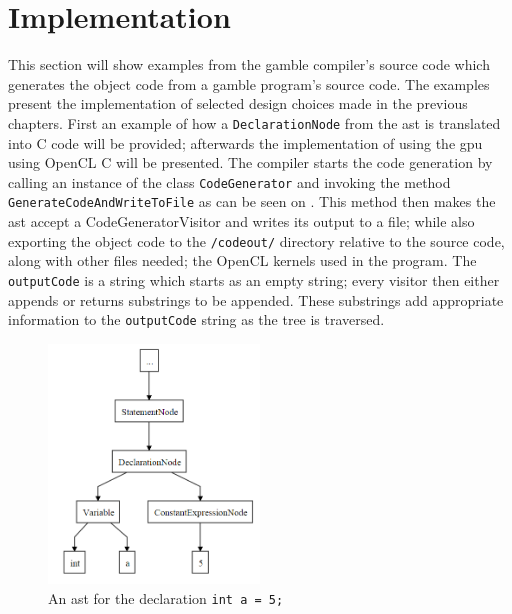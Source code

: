 \section{Implementation}
This section will show examples from the \gls{gamble} compiler's source code which generates the object code from a \gls{gamble} program's source code.
The examples present the implementation of selected design choices made in the previous chapters.
First an example of how a \texttt{DeclarationNode} from the \acrshort{ast} is translated into C code will be provided; afterwards the implementation of using the \acrshort{gpu} using OpenCL C will be presented.
The compiler starts the code generation by calling an instance of the class \texttt{CodeGenerator} and invoking the method \texttt{GenerateCodeAndWriteToFile} as can be seen on .
This method then makes the \acrshort{ast} accept a CodeGeneratorVisitor and writes its output to a file; while also exporting the object code to the \texttt{/codeout/} directory relative to the source code, along with other files needed; the OpenCL kernels used in the program.
The \texttt{outputCode} is a string which starts as an empty string; every visitor then either appends or returns substrings to be appended.
These substrings add appropriate information to the \texttt{outputCode} string as the tree is traversed.

\begin{figure}
\centering
\includegraphics[width=0.5\textwidth]{figures/Trees/ASTAlone.PNG}
\caption{An \acrshort{ast} for the declaration \texttt{int a = 5;}}\label{fig:ASTAlone}
\end{figure}

